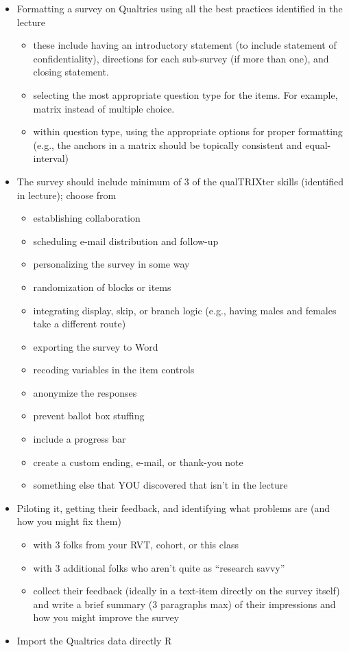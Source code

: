 \documentclass[
  english,
]{book}
\providecommand{\tightlist}{%
  \setlength{\itemsep}{0pt}\setlength{\parskip}{0pt}}
\begin{document}
\begin{itemize}
\tightlist
\item
  Formatting a survey on Qualtrics using all the best practices identified in the lecture

  \begin{itemize}
  \tightlist
  \item
    these include having an introductory statement (to include statement of confidentiality), directions for each sub-survey (if more than one), and closing statement.
  \item
    selecting the most appropriate question type for the items. For example, matrix instead of multiple choice.
  \item
    within question type, using the appropriate options for proper formatting (e.g., the anchors in a matrix should be topically consistent and equal-interval)
  \end{itemize}
\item
  The survey should include minimum of 3 of the qualTRIXter skills (identified in lecture); choose from

  \begin{itemize}
  \tightlist
  \item
    establishing collaboration
  \item
    scheduling e-mail distribution and follow-up
  \item
    personalizing the survey in some way
  \item
    randomization of blocks or items
  \item
    integrating display, skip, or branch logic (e.g., having males and females take a different route)
  \item
    exporting the survey to Word
  \item
    recoding variables in the item controls
  \item
    anonymize the responses
  \item
    prevent ballot box stuffing
  \item
    include a progress bar
  \item
    create a custom ending, e-mail, or thank-you note
  \item
    something else that YOU discovered that isn't in the lecture
  \end{itemize}
\item
  Piloting it, getting their feedback, and identifying what problems are (and how you might fix them)

  \begin{itemize}
  \tightlist
  \item
    with 3 folks from your RVT, cohort, or this class
  \item
    with 3 additional folks who aren't quite as ``research savvy''
  \item
    collect their feedback (ideally in a text-item directly on the survey itself) and write a brief summary (3 paragraphs max) of their impressions and how you might improve the survey
  \end{itemize}
\item
  Import the Qualtrics data directly R


\end{itemize}
\end{document}
